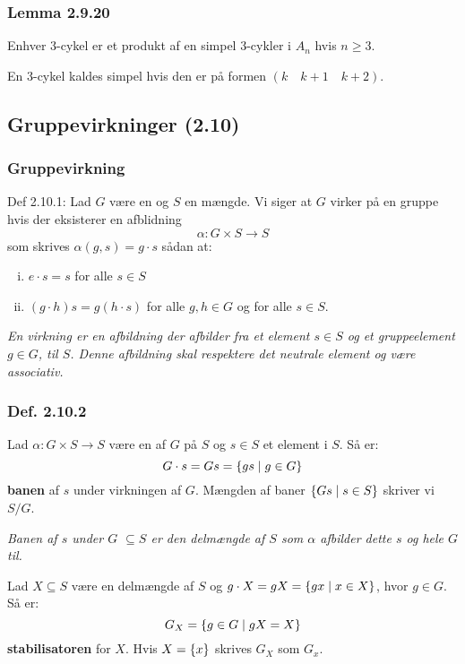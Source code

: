 \subsubsection{Lemma 2.9.20}
Enhver 3-cykel er et produkt af en simpel 3-cykler i $A_n$ hvis $n \geq 3$.

En 3-cykel kaldes simpel hvis den er på formen $(k \quad k + 1 \quad k + 2)$.

\subsection{Gruppevirkninger (2.10)}
\subsubsection{Gruppevirkning}
\label{Gruppevirkning}
Def 2.10.1: Lad $G$ være en  og $S$ en mængde. Vi siger at $G$
virker på en gruppe hvis der eksisterer en afblidning
\begin{equation*}
  \alpha: G \times S \rightarrow S
\end{equation*}
som skrives $\alpha(g,s) = g \cdot s$ sådan at:
\begin{enumerate}[(i)]
  \item $e \cdot s = s$ for alle $s \in S$
  \item $(g \cdot h) s = g (h \cdot s)$ for alle $g,h \in G$ og for alle $s \in
  S$.
\end{enumerate}

\textit{En virkning er en afbildning der afbilder fra et element $s \in S$ og et
gruppeelement $g \in G$, til $S$. Denne afbildning skal respektere det neutrale
element og være associativ.}

\subsubsection{Def. 2.10.2}
\label{2.10.2}
Lad $\alpha: G \times S \rightarrow S$ være en  af $G$
på $S$ og $s \in S$ et element i $S$. Så er:
\begin{equation*}
  G \cdot s = Gs = \{ gs\mid g \in G \}
\end{equation*}
\textbf{banen} af $s$ under virkningen af $G$. Mængden af baner
$\{ Gs\mid s \in S \}$ skriver vi $S/G$.

\textit{Banen af $s$ under $G$  $\subseteq S$ er den delmængde af $S$ som
$\alpha$ afbilder dette $s$ og hele $G$ til.}

Lad $X \subseteq S$ være en delmængde af $S$ og $g \cdot X = gX = \{ gx\mid
x \in X \}$, hvor $g \in G$. Så er:
\begin{equation*}
  G_X = \{ g \in G\mid gX = X \}
\end{equation*}
\textbf{stabilisatoren} for $X$. Hvis $X = \{ x \}$ skrives $G_X$ som
$G_x$.

